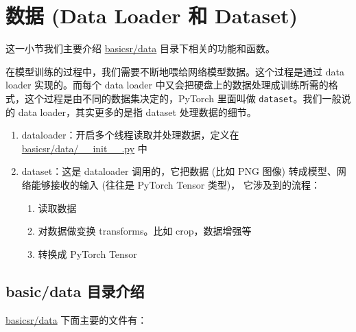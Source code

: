 \documentclass[../main.tex]{subfiles}
\begin{document}
\section{数据 (Data Loader 和 Dataset)}\label{code_structure:data}

这一小节我们主要介绍 \href{https://github.com/XPixelGroup/BasicSR/tree/master/basicsr/data}{basicsr/data} 目录下相关的功能和函数。

在模型训练的过程中，我们需要不断地喂给网络模型数据。这个过程是通过 data loader 实现的。而每个 data loader 中又会把硬盘上的数据处理成训练所需的格式，这个过程是由不同的数据集决定的，PyTorch 里面叫做 \texttt{dataset}。我们一般说的 data loader，其实更多的是指 dataset 处理数据的细节。

\begin{enumerate}
    \item dataloader：开启多个线程读取并处理数据，定义在 \href{https://github.com/XPixelGroup/BasicSR/blob/master/basicsr/data/\_\_init\_\_.py}{basicsr/data/\_\_init\_\_.py} 中
    \item dataset：这是 dataloader 调用的，它把数据 (比如 PNG 图像) 转成模型、网络能够接收的输入 (往往是 PyTorch Tensor 类型)， 它涉及到的流程：
          \begin{enumerate}
              \item 读取数据
              \item 对数据做变换 transforms。比如 crop，数据增强等
              \item 转换成 PyTorch Tensor
          \end{enumerate}
\end{enumerate}

\subsection{basic/data 目录介绍}\label{code_structure:data_contents}

\href{https://github.com/XPixelGroup/BasicSR/tree/master/basicsr/data}{basicsr/data} 下面主要的文件有：

\vspace{0.5cm}
\renewcommand*\DTstyle{\ttfamily\textcolor{black}}
\vspace{0.5cm}
\end{document}

